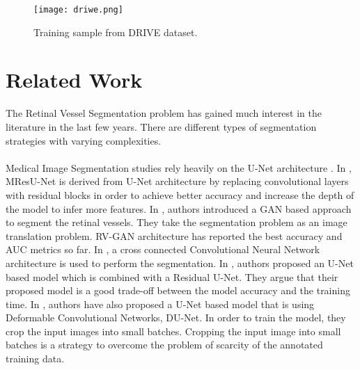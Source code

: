 \documentclass{article}
\begin{document}
\begin{figure}\centering
\texttt{[image: driwe.png]}
\caption{Training sample from DRIVE dataset.}
\label{fig:driwe}
\end{figure}

\section{Related Work}
\label{sec:relatedwork}
The Retinal Vessel Segmentation problem has gained much interest in the literature in the last few  years. There are different types of segmentation strategies with varying complexities.
\\\\

Medical Image Segmentation studies rely heavily on the U-Net architecture \cite{ronneberger2015unet}. In \cite{8803101}, MResU-Net is derived from U-Net architecture by replacing convolutional layers with residual blocks in order to achieve better accuracy and increase the depth of the model to infer more features.  In \cite{kamran2021rvgan}, authors introduced a GAN \cite{goodfellow2014generative} based approach to segment the retinal vessels. They take the segmentation problem as an image translation problem. RV-GAN architecture has reported the best accuracy and AUC metrics so far. In \cite{8759448},  a cross connected Convolutional Neural Network architecture is used to perform the segmentation. In \cite{article}, authors proposed an U-Net based model which is combined with a Residual U-Net. They argue  that their proposed model is a good trade-off between the model accuracy and the training time. In \cite{Jin_2019}, authors have also proposed a U-Net based model that is using Deformable Convolutional Networks, DU-Net. In order to train the model, they crop the input images into small batches. Cropping the input image into small batches is a strategy to overcome the problem of scarcity of the annotated training data.\\\\
\end{document}
